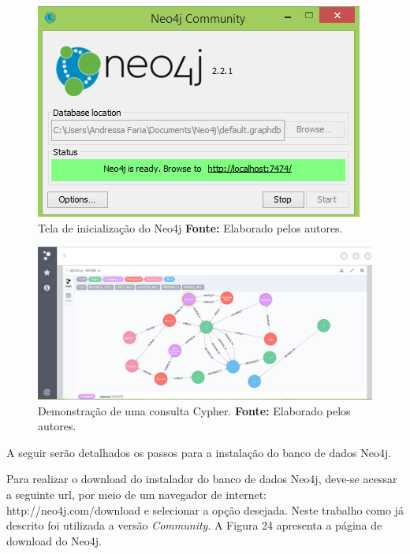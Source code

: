 \newpage
\begin{figure}[h!]
	\centerline{\includegraphics[scale=0.60]{./imagens/neo4j.jpg}}
	\caption[Tela de inicialização do Neo4j ]
	{Tela de inicialização do Neo4j \textbf{Fonte:} Elaborado pelos autores.}
	\label{fig:exemplo1}
\end{figure}

\begin{figure}[h!]
	\centerline{\includegraphics[scale=0.4]{./imagens/neo4j2.jpg}}
	\caption[Demonstração de uma consulta Cypher.]
	{Demonstração de uma consulta Cypher. \textbf{Fonte:} Elaborado pelos autores.}
	\label{fig:exemplo1}
\end{figure}

\par A seguir serão detalhados os passos para a instalação do banco de dados Neo4j.

\par Para realizar o download do instalador do banco de dados Neo4j, deve-se acessar a seguinte url, por meio de um  navegador de internet: http://neo4j.com/download e selecionar a opção desejada. Neste trabalho como já descrito foi utilizada a versão \textit{Community}. A Figura 24 apresenta a página de download do Neo4j.

